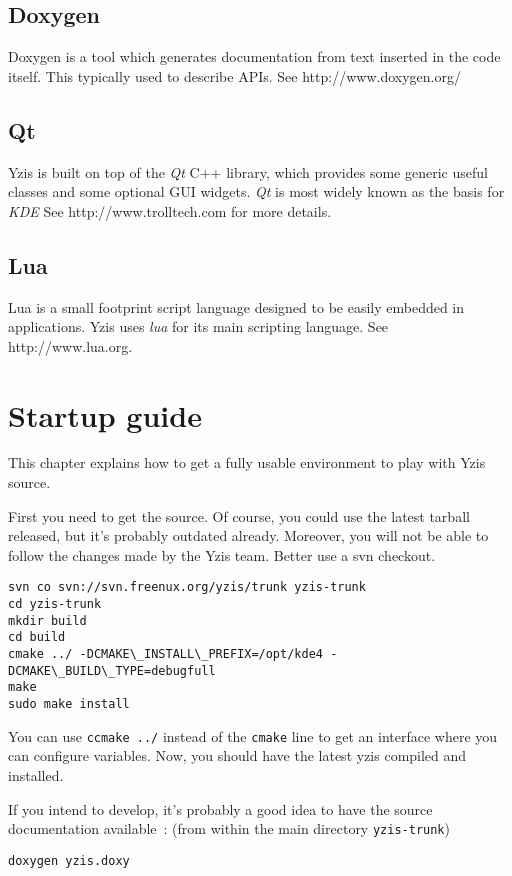 \documentclass[a4paper,12pt]{report}
\begin{document}
\section{Doxygen}
Doxygen is a tool which generates documentation from text inserted in the
code itself. This typically used to describe APIs.
See http://www.doxygen.org/

\section{Qt}
Yzis is built on top of the \emph{Qt} C++ library, which provides some
generic useful classes and some optional GUI widgets. \emph{Qt} is most
widely known as the basis for \emph{KDE}
See http://www.trolltech.com for more details.

\section{Lua}
Lua is a small footprint script language designed to be easily embedded in
applications. Yzis uses \emph{lua} for its main scripting language. See
http://www.lua.org.

\chapter{Startup guide}
This chapter explains how to get a fully usable environment to play with
Yzis source.

First you need to get the source. Of course, you could use the latest
tarball released, but it's probably outdated already. Moreover, you will
not be able to follow the changes made by the Yzis team.
Better use a svn checkout. 

\begin{verbatim}
svn co svn://svn.freenux.org/yzis/trunk yzis-trunk
cd yzis-trunk
mkdir build
cd build
cmake ../ -DCMAKE\_INSTALL\_PREFIX=/opt/kde4 -DCMAKE\_BUILD\_TYPE=debugfull
make
sudo make install
\end{verbatim}

You can use \verb+ccmake ../+ instead of the \verb+cmake+ line to get an
interface where you can configure variables.
Now, you should have the latest yzis compiled and installed.

If you intend to develop, it's probably a good idea to have the source
documentation available~: (from within the main directory \verb+yzis-trunk+)

\begin{verbatim}
doxygen yzis.doxy
\end{verbatim}
\end{document}
